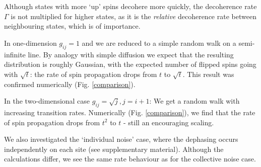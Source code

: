 Although states with more `up' spins decohere more quickly, the decoherence rate $\Gamma$ is not multiplied for higher states, as it is the \textit{relative} decoherence rate between neighbouring states, which is of importance.

In one-dimension $g_{ij} = 1$ and we are reduced to a simple random walk on a semi-infinite line. By analogy with simple diffusion we expect that the resulting distribution is roughly Gaussian, with the expected number of flipped spins going with $\sqrt{t}$: the rate of spin propagation drops from $t$ to $\sqrt{t}$. This result was confirmed numerically (Fig. \ref{comparison}).

In the two-dimensional case $g_{ij} = \sqrt{j}, j=i+1$: We get a random walk with increasing transition rates. Numerically (Fig. \ref{comparison}), we find that the rate of spin propagation drops from $t^2$ to $t$ - still an encouraging scaling.


        We also investigated the `individual noise' case, where the dephasing occurs independently on each site (see supplementary material). Although the calculations differ, we see the same rate behaviour as for the collective noise case.



